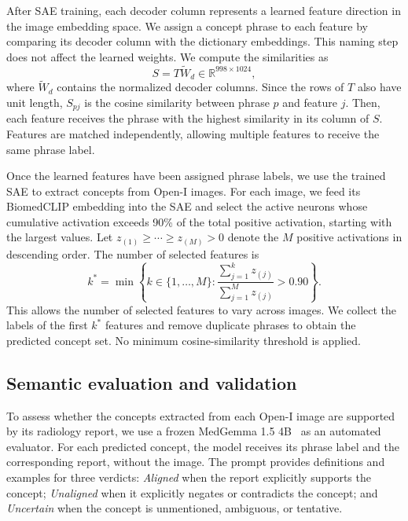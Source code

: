 After SAE training, each decoder column represents a learned feature direction in the image embedding space. We assign a concept phrase to each feature by comparing its decoder column with the dictionary embeddings. This naming step does not affect the learned weights. We compute the similarities as
\begin{equation}
S=T\widetilde{W}_d\in\mathbb{R}^{998\times1024},
\end{equation}
where $\widetilde{W}_d$ contains the normalized decoder columns. Since the rows of $T$ also have unit length, $S_{pj}$ is the cosine similarity between phrase $p$ and feature $j$. Then, each feature receives the phrase with the highest similarity in its column of $S$. Features are matched independently, allowing multiple features to receive the same phrase label.

Once the learned features have been assigned phrase labels, we use the trained SAE to extract concepts from Open-I images. For each image, we feed its BiomedCLIP embedding into the SAE and select the active neurons whose cumulative activation exceeds 90\% of the total positive activation, starting with the largest values. Let $z_{(1)}\geq\cdots\geq z_{(M)}>0$ denote the $M$ positive activations in descending order. The number of selected features is
\begin{equation}
k^*=\min\left\{k\in\{1,\ldots,M\}:\frac{\sum_{j=1}^{k}z_{(j)}}{\sum_{j=1}^{M}z_{(j)}}>0.90\right\}.
\end{equation}
This allows the number of selected features to vary across images. We collect the labels of the first $k^*$ features and remove duplicate phrases to obtain the predicted concept set. No minimum cosine-similarity threshold is applied.


\subsection{Semantic evaluation and validation}
To assess whether the concepts extracted from each Open-I image are supported by its radiology report, we use a frozen MedGemma 1.5 4B~\cite{sellergren2026medgemma} as an automated evaluator. For each predicted concept, the model receives its phrase label and the corresponding report, without the image. The prompt provides definitions and examples for three verdicts: \emph{Aligned} when the report explicitly supports the concept; \emph{Unaligned} when it explicitly negates or contradicts the concept; and \emph{Uncertain} when the concept is unmentioned, ambiguous, or tentative.

